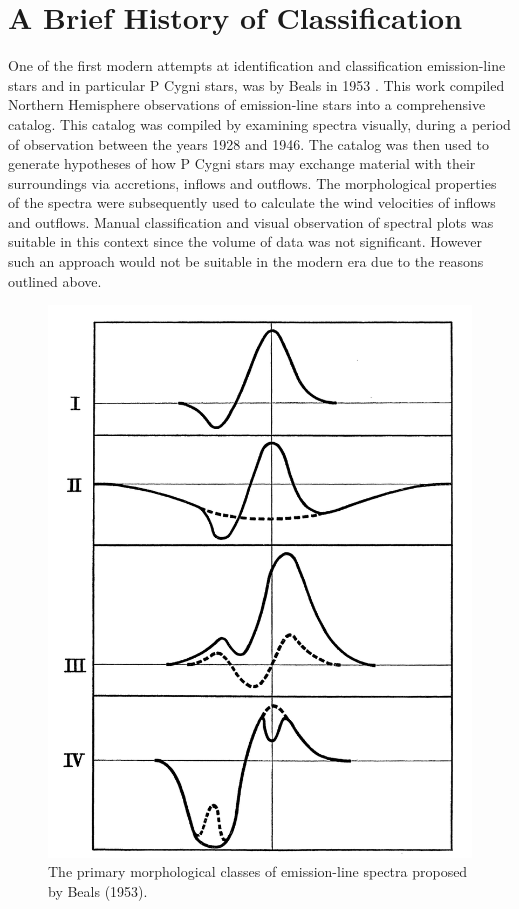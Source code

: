 \section{A Brief History of Classification}
One of the first modern attempts at identification and classification emission-line stars and in particular P Cygni stars, was by Beals in 1953 \cite{1953PDAO....9....1B}. This work compiled Northern Hemisphere observations of emission-line stars into a comprehensive catalog. This catalog was compiled by examining spectra visually, during a period of observation between the years 1928 and 1946. The catalog was then used to generate hypotheses of how P Cygni stars may exchange material with their surroundings via accretions, inflows and outflows. The morphological properties of the spectra were subsequently used to calculate the wind velocities of inflows and outflows. Manual classification and visual observation of spectral plots was suitable in this context since the volume of data was not significant. However such an approach would not be suitable in the modern era due to the reasons outlined above.

\begin{figure}[!htb]
\centering
\includegraphics[scale=.30]{figures/beals class 1.png}
\caption{The primary morphological classes of emission-line spectra proposed by Beals (1953)\cite{1953PDAO....9....1B}.}
\end{figure}

